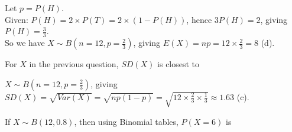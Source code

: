 \documentclass[bigtut]{tutorial}
\begin{document}
\begin{tutorial}
\begin{questions}
\begin{solution}
Let $p = P(H)$. \\
Given: $P(H) = 2 \times P(T) = 2 \times (1-P(H))$, hence $3P(H) = 2$, giving $P(H)=\frac{3}{3}$. \\
So we have $X \sim B(n=12,p=\frac{2}{3})$, giving $E(X)=np = 12 \times \frac{2}{3} = 8$ (d).
\end{solution}


\question
For $X$ in the previous question, $SD(X)$ is closest to
\begin{solution}
$X \sim B(n=12,p=\frac{2}{3})$, giving $SD(X)=\sqrt{Var(X)} = \sqrt{np(1-p)} = \sqrt{12 \times \frac{2}{3} \times \frac{1}{3}}  \approx 1.63$ (c).
\end{solution}


\question
If $X \sim B(12,0.8)$, then using Binomial tables, $P(X=6)$ is 
\begin{parts}[5]

\end{parts}
\end{questions}
\end{tutorial}
\end{document}
